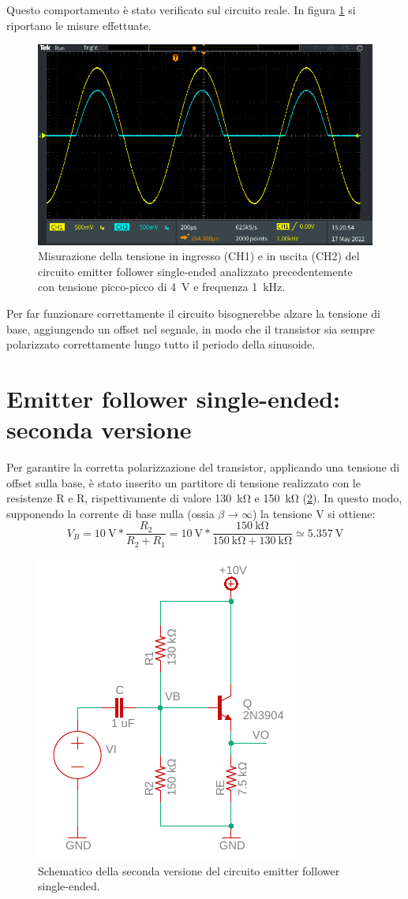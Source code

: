 Questo comportamento è stato verificato sul circuito reale. In figura \ref{fig:emitterfollwer_se_errore} si riportano le misure effettuate.
\begin{figure}[h!]
	\centering
	\includegraphics[width=0.7\linewidth]{./ImageFiles/Laboratorio 2/TEK00020}
	\caption{Misurazione della tensione in ingresso (CH1) e in uscita (CH2) del circuito emitter follower single-ended analizzato precedentemente con tensione picco-picco di \SI{4}{\volt} e frequenza \SI{1}{\kilo\hertz}.}
	\label{fig:emitterfollwer_se_errore}
\end{figure}

Per far funzionare correttamente il circuito bisognerebbe alzare la tensione di base, aggiungendo un offset nel segnale, in modo che il transistor sia sempre polarizzato correttamente lungo tutto il periodo della sinusoide.

\section{Emitter follower single-ended: seconda versione}
Per garantire la corretta polarizzazione del transistor, applicando una tensione di offset sulla base, è stato inserito un partitore di tensione realizzato con le resistenze R e R, rispettivamente di valore \SI{130}{\kilo\ohm} e \SI{150}{\kilo\ohm} (\Fig\ref{fig:emitterfollwer_v2}). In questo modo, supponendo la corrente di base nulla (ossia $\beta\to\infty$) la tensione V si ottiene:
\begin{equation}
	V_B= \SI{10}{\volt}*\frac{R_2}{R_2+R_1}
	=\SI{10}{\volt}*\frac{\SI{150}{\kilo\ohm}}{\SI{150}{\kilo\ohm}+\SI{130}{\kilo\ohm}}\simeq\SI{5.357}{\volt}
	\label{eq:1}
\end{equation}
\begin{figure}[h!]
	\centering
	\includegraphics[width=0.4\linewidth]{./OtherFiles/Laboratorio 2/emitter follower_v2}
	\caption{Schematico della seconda versione del circuito emitter follower single-ended.}
	\label{fig:emitterfollwer_v2}
\end{figure}

